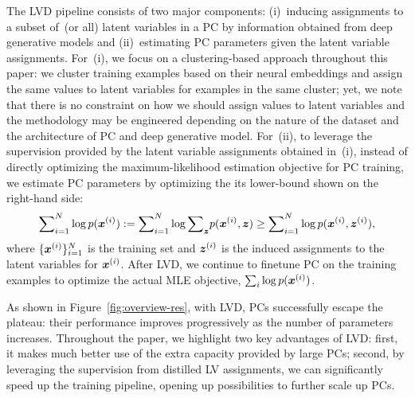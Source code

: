 \documentclass{article} %
\begin{document}
The LVD pipeline consists of two major components: (i)~inducing assignments to a subset of~(or all) latent variables in a PC by information obtained from deep generative models and (ii)~estimating PC parameters given the latent variable assignments. For~(i), we focus on a clustering-based approach throughout this paper: we cluster training examples based on their neural embeddings and assign the same values to latent variables for examples in the same cluster; yet, we note that there is no constraint on how we should assign values to latent variables and the methodology may be engineered depending on the nature of the dataset and the architecture of PC and deep generative model. For~(ii), to leverage the supervision provided by the latent variable assignments obtained in~(i), instead of directly optimizing the maximum-likelihood estimation objective for PC training, we estimate PC parameters by optimizing the its lower-bound shown on the right-hand side:
    \begin{align}
        {\sum}_{i=1}^{N} \log {p}(\boldsymbol{x}^{(i)}) := {\sum}_{i=1}^{N}\log{\sum}_{\boldsymbol{z}} {p}(\boldsymbol{x}^{(i)}, \boldsymbol{z}) \geq {\sum}_{i=1}^{N} \log{p}(\boldsymbol{x}^{(i)}, \boldsymbol{z}^{(i)}), 
        \label{eq:mle-lowerbound}
    \end{align}
where $\{\boldsymbol{x}^{(i)}\}_{i=1}^{N}$ is the training set and $\boldsymbol{z}^{(i)}$ is the induced assignments to the latent variables for $\boldsymbol{x}^{(i)}$. After LVD, we continue to finetune PC on the training examples to optimize the actual MLE objective, \ie ${\sum}_{i} \log {p}(\boldsymbol{x}^{(i)})$. 

As shown in Figure~\ref{fig:overview-res}, with LVD, PCs successfully escape the plateau: their performance improves progressively as the number of parameters increases. Throughout the paper, we highlight two key advantages of LVD: first, it makes much better use of the extra capacity provided by large PCs; second, by leveraging the supervision from distilled LV assignments, we can significantly speed up the training pipeline, opening up possibilities to further scale up PCs.

\end{document}

